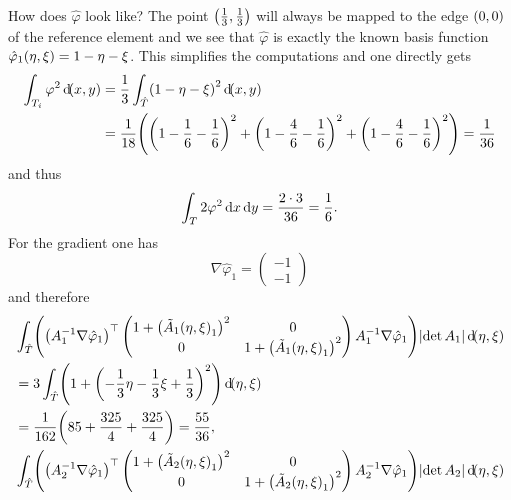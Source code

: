 \documentclass[english]{exercise}
\begin{document}
\begin{enumerate}
        How does \(\hat{\varphi}\) look like?
        The point \(\parentheses*{\frac{1}{3}, \frac{1}{3}}\) will always be mapped to the edge \(\parentheses*{0, 0}\) of the reference element and we see that \(\hat{\varphi}\) is exactly the known basis function \(\hat{\varphi}_1\parentheses*{\eta, \xi} = 1 - \eta - \xi\).
        This simplifies the computations and one directly gets
        \begin{align*}
            \int_{T_i}\varphi^2 \d\parentheses*{x, y} &= \frac{1}{3}\int_{\hat{T}}\parentheses*{1 - \eta - \xi}^2 \d\parentheses*{x, y}\\
            &= \frac{1}{18}\parentheses*{\parentheses*{1 - \frac{1}{6} - \frac{1}{6}}^2 + \parentheses*{1 - \frac{4}{6} - \frac{1}{6}}^2 + \parentheses*{1 - \frac{4}{6} - \frac{1}{6}}^2} = \frac{1}{36}
        \end{align*}
        and thus
        \[
            \int_T 2\varphi^2 \d x\d y = \frac{2 \cdot 3}{36} = \frac{1}{6}.
        \]
        For the gradient one has
        \[
            \nabla\hat{\varphi}_1 = \begin{pmatrix}
                -1\\
                -1
            \end{pmatrix}
        \]
        and therefore
        \begin{align*}
            &\int_{\hat{T}}\parentheses*{\parentheses*{A_1^{-1}\nabla\hat{\varphi}_1}^\top \begin{pmatrix}
                1 + \parentheses*{\tilde{A}_1\parentheses*{\eta, \xi}_1}^2 & 0\\
                0 & 1 + \parentheses*{\tilde{A}_1\parentheses*{\eta, \xi}_1}^2
            \end{pmatrix}A_1^{-1}\nabla\hat{\varphi}_1}\absolute*{\det A_1}\d\parentheses*{\eta, \xi}\\
            &= 3\int_{\hat{T}}\parentheses*{1 + \parentheses*{-\frac{1}{3}\eta - \frac{1}{3}\xi + \frac{1}{3}}^2}\d\parentheses*{\eta, \xi}\\
            &= \frac{1}{162}\parentheses*{85 + \frac{325}{4} + \frac{325}{4}} = \frac{55}{36},\\
            &\int_{\hat{T}}\parentheses*{\parentheses*{A_2^{-1}\nabla\hat{\varphi}_1}^\top \begin{pmatrix}
                1 + \parentheses*{\tilde{A}_2\parentheses*{\eta, \xi}_1}^2 & 0\\
                0 & 1 + \parentheses*{\tilde{A}_2\parentheses*{\eta, \xi}_1}^2
            \end{pmatrix}A_2^{-1}\nabla\hat{\varphi}_1}\absolute*{\det A_2}\d\parentheses*{\eta, \xi}\\

\end{align*}
\end{enumerate}
\end{document}
